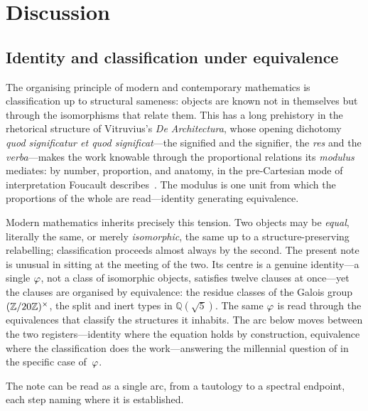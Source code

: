 \section{Discussion}
\label{sec:discussion}

\subsection*{Identity and classification under equivalence}
The organising principle of modern and contemporary mathematics is
classification up to structural sameness: objects are known not in
themselves but through the isomorphisms that relate them.  This has a long
prehistory in the rhetorical structure of Vitruvius's \emph{De
Architectura}, whose opening dichotomy \emph{quod significatur et quod
significat}---the signified and the signifier, the \emph{res} and the
\emph{verba}---makes the work knowable through the proportional relations
its \emph{modulus} mediates: by number, proportion, and anatomy, in the
pre-Cartesian mode of interpretation Foucault
describes~\cite{santos-vitruvio,foucault-1966}.  The modulus is one unit
from which the proportions of the whole are read---identity generating
equivalence.

Modern mathematics inherits precisely this tension.  Two objects may be
\emph{equal}, literally the same, or merely \emph{isomorphic}, the same up
to a structure-preserving relabelling; classification proceeds almost always
by the second.  The present note is unusual in sitting at the meeting of the
two.  Its centre is a genuine identity---a single $\varphi$, not a class of
isomorphic objects, satisfies twelve clauses at once---yet the clauses are
organised by equivalence: the residue classes of the Galois group
$(\mathbb{Z}/20\mathbb{Z})^{\times}$, the split and inert types in $\mathbb{Q}(\sqrt5)$.  The same
$\varphi$ is read through the equivalences that classify the structures it
inhabits.  The arc below moves between the two registers---identity where
the equation holds by construction, equivalence where the classification
does the work---answering the millennial question of
 in the specific case of~$\varphi$.

The note can be read as a single arc, from a tautology to a spectral
endpoint, each step naming where it is established.

